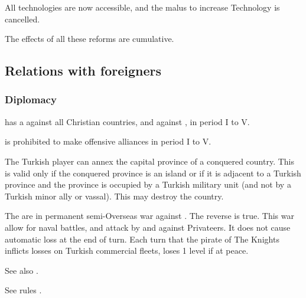 All technologies are now accessible, and the malus to increase
Technology is cancelled.

\aparag The effects of all these reforms are cumulative.

\subsection{Relations with foreigners}
\subsubsection{Diplomacy}
\aparag \TUR has a \CB against all Christian countries, and against
, in period I to V.

\aparag \TUR is prohibited to make offensive alliances in period I to V.

 The Turkish player can annex the capital
province of a conquered country. This is valid only if the conquered
province is an island or if it is adjacent to a Turkish province 
%
%
and the province is occupied by a Turkish military unit (and not by a
Turkish minor ally or vassal). This may destroy the country.

 The  are in
permanent semi-Overseas war against \TUR. The reverse is true. This war
allow for naval battles, and attack by and against Privateers. It does
not cause automatic \STAB loss at the end of turn.
\bparag Each turn that the pirate of The Knights inflicts losses on
Turkish commercial fleets, \TUR loses 1 \STAB level if at peace.

\aparag See also .

 See rules
.


